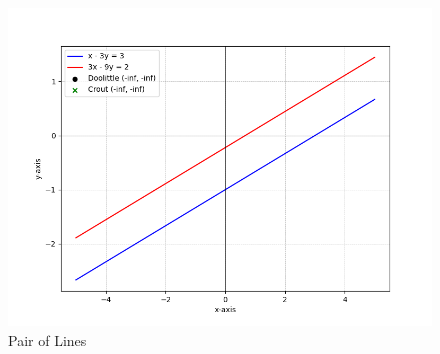 \documentclass[journal]{IEEEtran}
\numberwithin{equation}{enumi}
\numberwithin{figure}{enumi}
\begin{document}
\begin{figure}[H]
   \centering
   \includegraphics[width=1\columnwidth]{figs/fig.png}
   \caption{Pair of Lines}
\end{figure}
\end{document}
